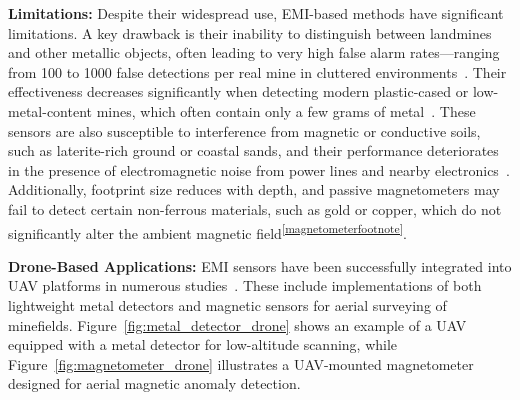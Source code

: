 \textbf{Limitations:} Despite their widespread use, EMI-based methods have significant limitations. A key drawback is their inability to distinguish between landmines and other metallic objects, often leading to very high false alarm rates—ranging from 100 to 1000 false detections per real mine in cluttered environments~\cite{Bruschini1997ASO, robledo2009survey}. Their effectiveness decreases significantly when detecting modern plastic-cased or low-metal-content mines, which often contain only a few grams of metal~\cite{gichd2006guidebook}. These sensors are also susceptible to interference from magnetic or conductive soils, such as laterite-rich ground or coastal sands, and their performance deteriorates in the presence of electromagnetic noise from power lines and nearby electronics~\cite{gichd2006guidebook}. Additionally, footprint size reduces with depth, and passive magnetometers may fail to detect certain non-ferrous materials, such as gold or copper, which do not significantly alter the ambient magnetic field\textsuperscript{\ref{magnetometerfootnote}}.

\textbf{Drone-Based Applications:} EMI sensors have been successfully integrated into UAV platforms in numerous studies~\cite{yoo2020drone,7529819,mu2020automatic,yoo2021application,BARNAWI2022441,rs15153813,barnawi2023graph,Barnawi2023ADL,s21093175,9251007,Safatly04032021,10745471,Stankevich2024OpticalAM,Joo2022OptimizationDM,rs16162916,Yoo2024UnmannedAV,rs16244732,Poliachenko_Kozak_Bakhmutov_Cherkes_Bilyi_2025}. These include implementations of both lightweight metal detectors and magnetic sensors for aerial surveying of minefields. Figure~\ref{fig:metal_detector_drone} shows an example of a UAV equipped with a metal detector for low-altitude scanning, while Figure~\ref{fig:magnetometer_drone} illustrates a UAV-mounted magnetometer designed for aerial magnetic anomaly detection. 

